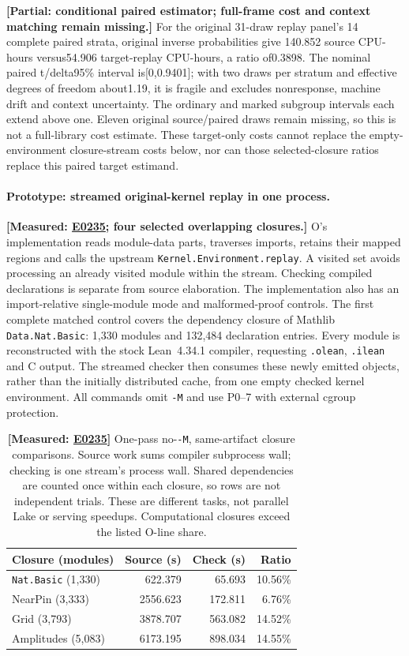 \documentclass[10pt,twocolumn]{article}
\newcommand{\measured}[1]{\textbf{[Measured: #1]}}
\newcommand{\partialev}[1]{\textbf{[Partial: #1]}}
\newcommand{\expref}[2]{\href{https://github.com/yunwei37/proofserve/blob/main/docs/tmp/build-and-evaluate/step-#1/step-report.md}{E#2}}
\begin{document}
\partialev{conditional paired estimator; full-frame cost and context matching remain missing.}
For the original 31-draw replay panel's 14 complete paired strata, original inverse probabilities give
140.852 source CPU-hours versus54.906 target-replay CPU-hours,
a ratio of0.3898. The nominal paired t/delta95\% interval is[0,0.9401];
with two draws per stratum and effective degrees of freedom about1.19,
it is fragile and excludes nonresponse, machine drift and context uncertainty.
The ordinary and marked subgroup intervals each extend above one.
Eleven original source/paired draws remain missing, so this is not a
full-library cost estimate. These target-only costs cannot replace the
empty-environment closure-stream costs below, nor can those selected-closure
ratios replace this paired target estimand.

\paragraph{Prototype: streamed original-kernel replay in one process.}
\measured{\expref{0235-20261101T041713+0000}{0235}; four selected overlapping closures.}
O's implementation reads module-data parts, traverses imports, retains their
mapped regions and calls the upstream \texttt{Kernel.Environment.replay}.
A visited set avoids processing an already visited module within the stream.
Checking compiled declarations is separate from source elaboration.
The implementation also has an import-relative single-module mode and
malformed-proof controls.
The first complete matched control covers the dependency closure of
Mathlib \texttt{Data.Nat.Basic}: 1,330 modules and 132,484 declaration entries.
Every module is reconstructed with the stock Lean~4.34.1 compiler, requesting
\texttt{.olean}, \texttt{.ilean} and C output.
The streamed checker then consumes these newly emitted objects, rather than
the initially distributed cache, from one empty checked kernel environment.
All commands omit \texttt{-M} and use P0--7 with external cgroup protection.

\begin{table}[t]
\centering\small
\setlength{\tabcolsep}{3pt}
\begin{tabular}{lrrr}
\toprule
Closure (modules) & Source (s) & Check (s) & Ratio\\
\midrule
\texttt{Nat.Basic} (1,330) &622.379&65.693&10.56\%\\
NearPin (3,333) &2556.623&172.811&6.76\%\\
Grid (3,793) &3878.707&563.082&14.52\%\\
Amplitudes (5,083) &6173.195&898.034&14.55\%\\
\bottomrule
\end{tabular}
\caption{\measured{\expref{0235-20261101T041713+0000}{0235}} One-pass no-\texttt{-M}, same-artifact closure comparisons.
Source work sums compiler subprocess wall; checking is one stream's process
wall. Shared dependencies are counted once within each closure, so rows are
not independent trials. These are different tasks, not parallel Lake or
serving speedups. Computational closures exceed the listed O-line share.}
\label{tab:stream}
\end{table}
\end{document}
